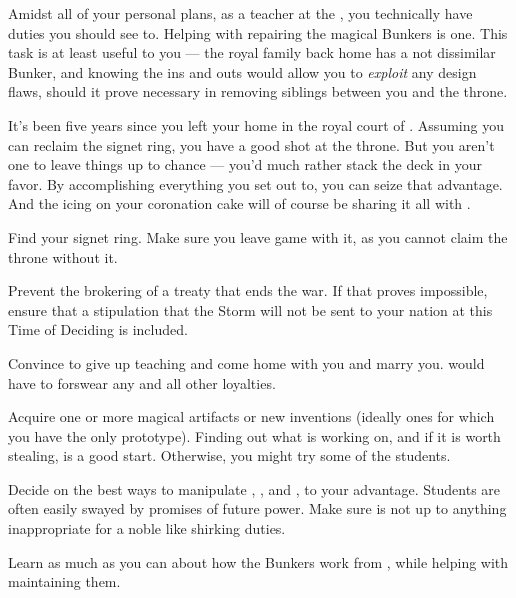 \documentclass[char]{GL2020}
\begin{document}
Amidst all of your personal plans, as a teacher at the \pSc{}, you technically have duties you should see to. Helping \cBunker{\full} with repairing the magical Bunkers is one. This task is at least useful to you — the royal family back home has a not dissimilar Bunker, and knowing the ins and outs would allow you to \emph{exploit} any design flaws, should it prove necessary in removing siblings between you and the throne.

It's been five years since you left your home in the royal court of \pFarm{}. Assuming you can reclaim the signet ring, you have a good shot at the throne. But you aren't one to leave things up to chance — you'd much rather stack the deck in your favor. By accomplishing everything you set out to, you can seize that advantage. And the icing on your coronation cake will of course be sharing it all with \cPirate{}.

\begin{itemz}
    \item Find your signet ring. Make sure you leave game with it, as you cannot claim the \pFarm{} throne without it.
    \item Prevent the brokering of a treaty that ends the war. If that proves impossible, ensure that a stipulation that the Storm will not be sent to your nation at this Time of Deciding is included.
    \item Convince \cPirate{} to give up teaching and come home with you and marry you. \cPirate{\They} would have to forswear any and all other loyalties.
    \item Acquire one or more magical artifacts or new inventions (ideally ones for which you have the only prototype). Finding out what \cCurse{} is working on, and if it is worth stealing, is a good start. Otherwise, you might try some of the \pTech{} students.
    \item Decide on the best ways to manipulate \cAdopted{}, \cAmbition{}, and \cChupStudent{}, to your advantage. Students are often easily swayed by promises of future power. Make sure \cAdopted{} is not up to anything inappropriate for a noble like shirking \cAdopted{\their} duties.
    \item Learn as much as you can about how the Bunkers work from \cBunker{}, while helping with maintaining them.
\end{itemz}
\end{document}
